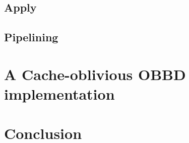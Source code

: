 \subsection{Apply}


\subsection{Pipelining}


\section{A Cache-oblivious OBBD implementation} \label{sec:implementation}


\section{Conclusion} \label{sec:conclusion}


\printbibliography




